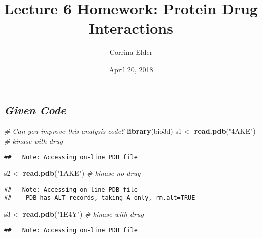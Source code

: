 \documentclass[]{article}
\title{Lecture 6 Homework: Protein Drug Interactions}
\author{Corrina Elder}
\date{April 20, 2018}
\newenvironment{Shaded}{\begin{snugshade}}{\end{snugshade}}
\newcommand{\KeywordTok}[1]{\textcolor[rgb]{0.13,0.29,0.53}{\textbf{#1}}}
\newcommand{\StringTok}[1]{\textcolor[rgb]{0.31,0.60,0.02}{#1}}
\newcommand{\CommentTok}[1]{\textcolor[rgb]{0.56,0.35,0.01}{\textit{#1}}}
\newcommand{\NormalTok}[1]{#1}
\begin{document}
\maketitle

\subsection{\texorpdfstring{\emph{Given
Code}}{Given Code}}\label{given-code}

\begin{Shaded}
\begin{Highlighting}[]
\CommentTok{# Can you improve this analysis code?}
\KeywordTok{library}\NormalTok{(bio3d)}
\NormalTok{s1 <-}\StringTok{ }\KeywordTok{read.pdb}\NormalTok{(}\StringTok{"4AKE"}\NormalTok{) }\CommentTok{# kinase with drug}
\end{Highlighting}
\end{Shaded}

\begin{verbatim}
##   Note: Accessing on-line PDB file
\end{verbatim}

\begin{Shaded}
\begin{Highlighting}[]
\NormalTok{s2 <-}\StringTok{ }\KeywordTok{read.pdb}\NormalTok{(}\StringTok{"1AKE"}\NormalTok{) }\CommentTok{# kinase no drug}
\end{Highlighting}
\end{Shaded}

\begin{verbatim}
##   Note: Accessing on-line PDB file
##    PDB has ALT records, taking A only, rm.alt=TRUE
\end{verbatim}

\begin{Shaded}
\begin{Highlighting}[]
\NormalTok{s3 <-}\StringTok{ }\KeywordTok{read.pdb}\NormalTok{(}\StringTok{"1E4Y"}\NormalTok{) }\CommentTok{# kinase with drug}
\end{Highlighting}
\end{Shaded}

\begin{verbatim}
##   Note: Accessing on-line PDB file
\end{verbatim}
\end{document}

